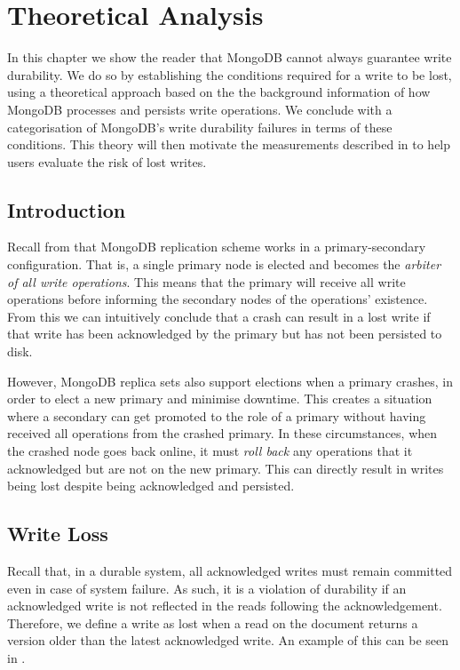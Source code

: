 \chapter{Theoretical Analysis} \label{chap:det-theory}

In this chapter we show the reader that MongoDB cannot always guarantee write durability. We do so by establishing the conditions required for a write to be lost, using a theoretical approach based on the the background information of how MongoDB processes and persists write operations. We conclude with a categorisation of MongoDB's write durability failures in terms of these conditions. This theory will then motivate the measurements described in  to help users evaluate the risk of lost writes.

\section{Introduction}
Recall from  that MongoDB replication scheme works in a primary-secondary configuration. That is, a single primary node is elected and becomes the \textit{arbiter of all write operations}. This means that the primary will receive all write operations before informing the secondary nodes of the operations' existence. From this we can intuitively conclude that a crash can result in a lost write if that write has been acknowledged by the primary but has not been persisted to disk.

However, MongoDB replica sets also support elections when a primary crashes, in order to elect a new primary and minimise downtime. This creates a situation where a secondary can get promoted to the role of a primary without having received all operations from the crashed primary. In these circumstances, when the crashed node goes back online, it must \textit{roll back} any operations that it acknowledged but are not on the new primary. This can directly result in writes being lost despite being acknowledged and persisted.

\section{Write Loss}
Recall that, in a durable system, all acknowledged writes must remain committed even in case of system failure. As such, it is a violation of durability if an acknowledged write is not reflected in the reads following the acknowledgement. Therefore, we define a write as lost when a read on the document returns a version older than the latest acknowledged write. An example of this can be seen in .

